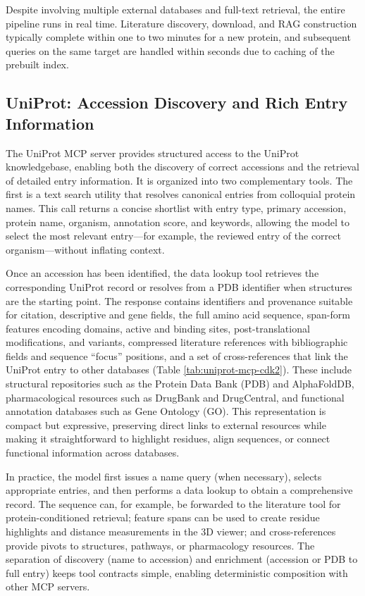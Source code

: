 \documentclass{article}
\begin{document}
Despite involving multiple external databases and full-text retrieval, the entire pipeline runs in real time. Literature discovery, download, and RAG construction typically complete within one to two minutes for a new protein, and subsequent queries on the same target are handled within seconds due to caching of the prebuilt index.




\subsection{UniProt: Accession Discovery and Rich Entry Information}\label{sec\:data\:uniprot}
The UniProt MCP server provides structured access to the UniProt knowledgebase, enabling both the discovery of correct accessions and the retrieval of detailed entry information. It is organized into two complementary tools. The first is a text search utility that resolves canonical entries from colloquial protein names. This call returns a concise shortlist with entry type, primary accession, protein name, organism, annotation score, and keywords, allowing the model to select the most relevant entry—for example, the reviewed entry of the correct organism—without inflating context.

Once an accession has been identified, the data lookup tool retrieves the corresponding UniProt record or resolves from a PDB identifier when structures are the starting point. The response contains identifiers and provenance suitable for citation, descriptive and gene fields, the full amino acid sequence, span-form features encoding domains, active and binding sites, post-translational modifications, and variants, compressed literature references with bibliographic fields and sequence “focus” positions, and a set of cross-references that link the UniProt entry to other databases (Table \ref{tab:uniprot-mcp-cdk2}). These include structural repositories such as the Protein Data Bank (PDB) and AlphaFoldDB, pharmacological resources such as DrugBank and DrugCentral, and functional annotation databases such as Gene Ontology (GO). This representation is compact but expressive, preserving direct links to external resources while making it straightforward to highlight residues, align sequences, or connect functional information across databases.

In practice, the model first issues a name query (when necessary), selects appropriate entries, and then performs a data lookup to obtain a comprehensive record. The sequence can, for example, be forwarded to the literature tool for protein-conditioned retrieval; feature spans can be used to create residue highlights and distance measurements in the 3D viewer; and cross-references provide pivots to structures, pathways, or pharmacology resources. The separation of discovery (name to accession) and enrichment (accession or PDB to full entry) keeps tool contracts simple, enabling deterministic composition with other MCP servers.
\end{document}
